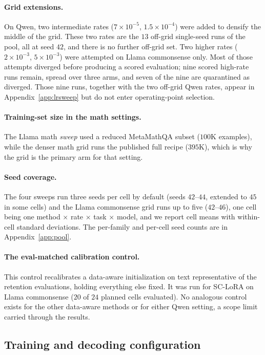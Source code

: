 \documentclass[11pt]{article}
\begin{document}
\paragraph{Grid extensions.} On Qwen, two intermediate rates
($7\times10^{-5}$, $1.5\times10^{-4}$) were added to densify the middle of the
grid. These two rates are the $13$ off-grid single-seed runs of the pool, all
at seed $42$, and there is no further off-grid set. Two higher rates
($2\times10^{-3}$, $5\times10^{-3}$) were attempted on Llama commonsense only.
Most of those attempts diverged before producing a scored evaluation; nine
scored high-rate runs remain, spread over three arms, and seven of the nine
are quarantined as diverged. Those nine runs, together with the two off-grid
Qwen rates, appear in Appendix~\ref{app:lrsweep} but do not enter
operating-point selection.

\paragraph{Training-set size in the math settings.} The Llama math \emph{sweep}
used a reduced MetaMathQA subset ($100$K examples), while the denser math grid
runs the published full recipe ($395$K), which is why the grid is the primary
arm for that setting.

\paragraph{Seed coverage.} The four sweeps run three seeds per cell by
default (seeds $42$--$44$, extended to $45$ in some cells) and the Llama
commonsense grid runs up to five ($42$--$46$), one cell being one method $\times$ rate $\times$ task
$\times$ model, and we report cell means with within-cell standard
deviations. The per-family and per-cell seed counts are in
Appendix~\ref{app:pool}.

\paragraph{The eval-matched calibration control.} This control recalibrates a
data-aware initialization on text representative of the retention
evaluations, holding everything else fixed. It was run for SC-LoRA on Llama
commonsense ($20$ of $24$ planned cells evaluated). No analogous control
exists for the other data-aware methods or for either Qwen setting, a scope
limit carried through the results.

\subsection{Training and decoding configuration}\label{app:traincfg}
\end{document}

